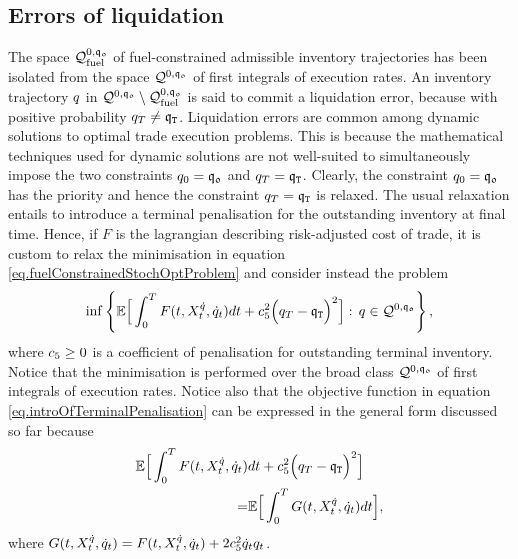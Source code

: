 \documentclass[10pt,a4paper]{article}
\begin{document}
\subsection{Errors of liquidation}\label{sec.errorsOfLiquidation}
The space $\mathcal{Q}_{\text{fuel}}^{0,\mathfrak{q_0}}$ of fuel-constrained admissible inventory trajectories has been isolated from the space $\mathcal{Q}^{0,\mathfrak{q_0}}$ of first integrals of execution rates. An inventory trajectory $q$ in $\mathcal{Q}^{0,\mathfrak{q_0}}\setminus \mathcal{Q}_{\text{fuel}}^{0,\mathfrak{q_0}}$ is said to commit a liquidation error, because with positive probability $q_T \neq \mathfrak{q}_{\mathtt{T} }$. Liquidation errors are common among dynamic solutions to optimal trade execution problems. This is because the mathematical techniques used for dynamic solutions are not well-suited to simultaneously impose the two constraints $q_0 = \mathfrak{q_0}$ and $q_T = \mathfrak{q}_{\mathtt{T} }$. Clearly, the constraint $q_0 = \mathfrak{q_0}$ has the priority and hence the constraint $q_T = \mathfrak{q}_{\mathtt{T} }$ is relaxed. The usual relaxation entails to introduce a terminal penalisation for the outstanding inventory at final time. Hence, if $F$ is the lagrangian describing risk-adjusted cost of trade, it is custom to relax the minimisation in equation \eqref{eq.fuelConstrainedStochOptProblem} and consider instead the problem
\begin{equation}
\label{eq.introOfTerminalPenalisation}
\inf\left\lbrace
\mathbb{{E}} \Big[
\int_{0}^{T} F(t,X_t^{\dot{q}},\dot{q}_{t}) dt + c_{5}^{2} \Big(q_T - \mathfrak{q}_{\mathtt{T} }\Big)^{2}
\Big] : \, 
q \in \mathcal{Q}^{0,\mathfrak{q_0}}
\right\rbrace,
\end{equation}
where $c_{5}\geq 0$ is a coefficient of penalisation for outstanding terminal inventory. Notice that the minimisation is performed over the broad class $\mathcal{Q}^{0,\mathfrak{q_0}}$ of first integrals of execution rates. Notice also that the objective function in equation \eqref{eq.introOfTerminalPenalisation} can be expressed in the general form discussed so far because 
\begin{equation*}
\begin{split}
\mathbb{{E}} \Big[
\int_{0}^{T} F(t,X_t^{\dot{q}},\dot{q}_{t}) &dt + c_{5}^{2} \Big(q_T - \mathfrak{q}_{\mathtt{T} }\Big)^{2}
\Big] \\
=& \mathbb{{E}} \Big[  \int_{0}^{T} G(t,X_t^{\dot{q}},\dot{q}_{t}) dt \Big],
\end{split}
\end{equation*}
where $ G(t,X_t^{\dot{q}},\dot{q}_{t}) =  F(t,X_t^{\dot{q}},\dot{q}_{t}) + 2c_{5}^{2} \dot{q}_{t} q_t$. 
\end{document}
